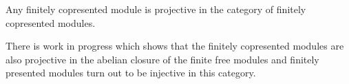 \begin{corollary}
Any finitely copresented module is projective in the category of finitely copresented modules.
\end{corollary}

There is work in progress \cite{wip-serre-duality} which shows that the finitely copresented modules are also projective in the abelian closure of the finite free modules and finitely presented modules turn out to be injective in this category.





